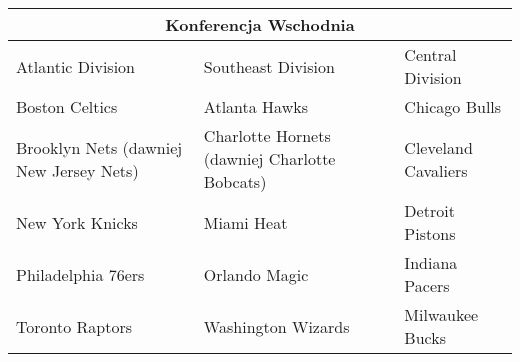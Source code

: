 \documentclass[inzynierska]{pwr_wmat_praca_dyplomowa}
\theoremstyle{plain}
\numberwithin{theorem}{chapter}
\theoremstyle{definition}
\numberwithin{theorem}{chapter}
\begin{document}
\\\\
\begin{tabular}{ |p{5cm}|p{5cm}|p{5cm}|  }
	\hline
	\multicolumn{3}{|c|}{Konferencja Wschodnia} \\
	\hline
	Atlantic Division& Southeast Division&Central Division\\
	\hline
	Boston Celtics& Atlanta Hawks &Chicago Bulls\\
	Brooklyn Nets (dawniej New Jersey Nets)&Charlotte Hornets (dawniej Charlotte Bobcats)&Cleveland Cavaliers\\
	New York Knicks &Miami Heat &Detroit Pistons\\
	Philadelphia 76ers&Orlando Magic &Indiana Pacers\\
	Toronto Raptors&Washington Wizards&Milwaukee Bucks\\
	\hline
\end{tabular}
\end{document}
